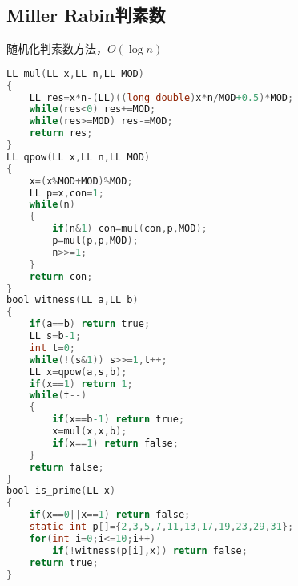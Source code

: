 \subsection{Miller Rabin判素数}
随机化判素数方法，$O(\log n)$
\begin{lstlisting}[language=C]
LL mul(LL x,LL n,LL MOD)
{
	LL res=x*n-(LL)((long double)x*n/MOD+0.5)*MOD;
	while(res<0) res+=MOD;
	while(res>=MOD) res-=MOD;
	return res;
}
LL qpow(LL x,LL n,LL MOD)
{
	x=(x%MOD+MOD)%MOD;
	LL p=x,con=1;
	while(n)
	{
		if(n&1) con=mul(con,p,MOD);
		p=mul(p,p,MOD);
		n>>=1;
	}
	return con;
}
bool witness(LL a,LL b)
{
	if(a==b) return true;
	LL s=b-1;
	int t=0;
	while(!(s&1)) s>>=1,t++;
	LL x=qpow(a,s,b);
	if(x==1) return 1;
	while(t--)
	{
		if(x==b-1) return true;
		x=mul(x,x,b);
		if(x==1) return false;
	}
	return false;
}
bool is_prime(LL x)
{
	if(x==0||x==1) return false;
	static int p[]={2,3,5,7,11,13,17,19,23,29,31};
	for(int i=0;i<=10;i++)
		if(!witness(p[i],x)) return false;
	return true;
}
\end{lstlisting}